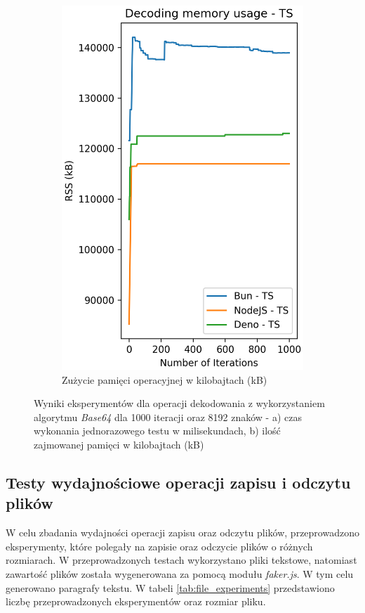 \begin{figure}[H]
\begin{subfigure}[b]{0.42\textwidth}
    \includegraphics[width=\textwidth]{Figures/coding/base64_1000_decoding_ts_memory.png}
    \caption{Zużycie pamięci operacyjnej w kilobajtach (kB)}
    \label{fig:decoding_e2_ts_memory}
  \end{subfigure}
  \hfill
  \caption{Wyniki eksperymentów dla operacji dekodowania z wykorzystaniem algorytmu \textit{Base64} dla 1000 iteracji oraz 8192 znaków - a) czas wykonania jednorazowego testu w milisekundach, b) ilość zajmowanej pamięci w kilobajtach (kB)}
  \label{fig:decoding_e2_ts}
\end{figure}

\subsection{Testy wydajnościowe operacji zapisu i odczytu plików}
W celu zbadania wydajności operacji zapisu oraz odczytu plików, przeprowadzono eksperymenty, które polegały na zapisie oraz odczycie plików o różnych rozmiarach. W przeprowadzonych testach wykorzystano pliki tekstowe, natomiast zawartość plików została wygenerowana za pomocą modułu \textit{faker.js}. W tym celu generowano paragrafy tekstu. W tabeli \ref{tab:file_experiments} przedstawiono liczbę przeprowadzonych eksperymentów oraz rozmiar pliku.


